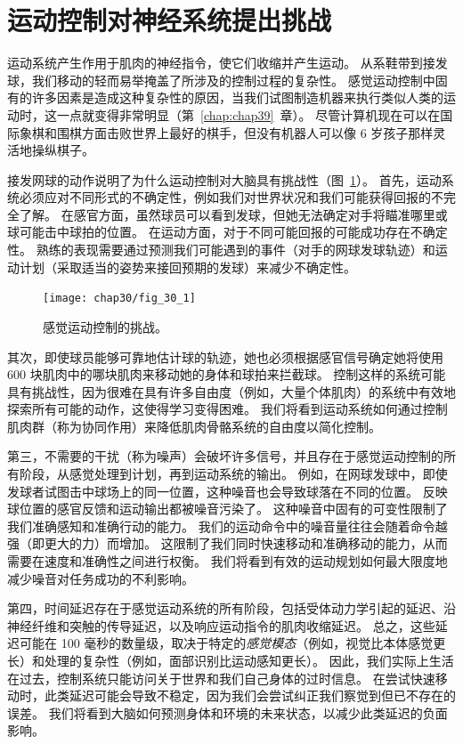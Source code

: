 \section{运动控制对神经系统提出挑战}

运动系统产生作用于肌肉的神经指令，使它们收缩并产生运动。
从系鞋带到接发球，我们移动的轻而易举掩盖了所涉及的控制过程的复杂性。
感觉运动控制中固有的许多因素是造成这种复杂性的原因，当我们试图制造机器来执行类似人类的运动时，这一点就变得非常明显（第~\ref{chap:chap39}~章）。 
尽管计算机现在可以在国际象棋和围棋方面击败世界上最好的棋手，但没有机器人可以像 6 岁孩子那样灵活地操纵棋子。


接发网球的动作说明了为什么运动控制对大脑具有挑战性（图~\ref{fig:30_1}）。
首先，运动系统必须应对不同形式的不确定性，例如我们对世界状况和我们可能获得回报的不完全了解。
在感官方面，虽然球员可以看到发球，但她无法确定对手将瞄准哪里或球可能击中球拍的位置。
在运动方面，对于不同可能回报的可能成功存在不确定性。
熟练的表现需要通过预测我们可能遇到的事件（对手的网球发球轨迹）和运动计划（采取适当的姿势来接回预期的发球）来减少不确定性。


\begin{figure}[htbp]
	\centering
	\texttt{[image: chap30/fig\_30\_1]}
	\caption{感觉运动控制的挑战。}
	\label{fig:30_1}
\end{figure}


其次，即使球员能够可靠地估计球的轨迹，她也必须根据感官信号确定她将使用 600 块肌肉中的哪块肌肉来移动她的身体和球拍来拦截球。
控制这样的系统可能具有挑战性，因为很难在具有许多自由度（例如，大量个体肌肉）的系统中有效地探索所有可能的动作，这使得学习变得困难。
我们将看到运动系统如何通过控制肌肉群（称为协同作用）来降低肌肉骨骼系统的自由度以简化控制。


第三，不需要的干扰（称为噪声）会破坏许多信号，并且存在于感觉运动控制的所有阶段，从感觉处理到计划，再到运动系统的输出。
例如，在网球发球中，即使发球者试图击中球场上的同一位置，这种噪音也会导致球落在不同的位置。
反映球位置的感官反馈和运动输出都被噪音污染了。
这种噪音中固有的可变性限制了我们准确感知和准确行动的能力。
我们的运动命令中的噪音量往往会随着命令越强（即更大的力）而增加。
这限制了我们同时快速移动和准确移动的能力，从而需要在速度和准确性之间进行权衡。
我们将看到有效的运动规划如何最大限度地减少噪音对任务成功的不利影响。


第四，时间延迟存在于感觉运动系统的所有阶段，包括受体动力学引起的延迟、沿神经纤维和突触的传导延迟，以及响应运动指令的肌肉收缩延迟。
总之，这些延迟可能在 100 毫秒的数量级，取决于特定的\textit{感觉模态}（例如，视觉比本体感觉更长）和处理的复杂性（例如，面部识别比运动感知更长）。
因此，我们实际上生活在过去，控制系统只能访问关于世界和我们自己身体的过时信息。
在尝试快速移动时，此类延迟可能会导致不稳定，因为我们会尝试纠正我们察觉到但已不存在的误差。
我们将看到大脑如何预测身体和环境的未来状态，以减少此类延迟的负面影响。


